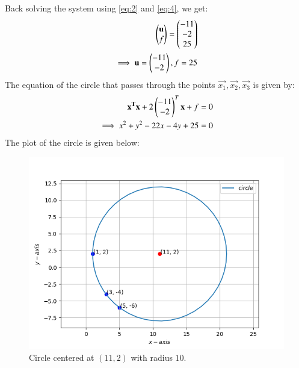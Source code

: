 \documentclass[journal,12pt,twocolumn]{IEEEtran}
\begin{document}
Back solving the system using \eqref{eq:2} and \eqref{eq:4}, we get:
\begin{align}
\begin{pmatrix}\mathbf{u}\\f\end{pmatrix}=\begin{pmatrix}-11 \\ -2 \\ 25\end{pmatrix} \\
\implies \mathbf{u} = \begin{pmatrix}-11 \\ -2\end{pmatrix}, f = 25
\end{align}
The equation of the circle that passes through the points $\vec{x_1}, \vec{x_2}, \vec{x_3}$ is given by:
\begin{align}
\mathbf{x^Tx}+2\begin{pmatrix}-11 \\ -2\end{pmatrix}^T\mathbf{x}+f = 0 \\
\implies x^2 + y^2 - 22x -4y + 25 = 0
\end{align}
The plot of the circle is given below:
\begin{figure}[t]
\centering
    \includegraphics[width=\columnwidth]{figure.png}
    \caption{Circle centered at $(11, 2)$ with radius $10$.}
    \label{fig:1}
\end{figure}
\end{document}
